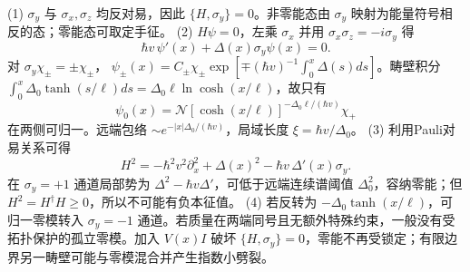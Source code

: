 (1) \(\sigma_y\) 与 \(\sigma_x,\sigma_z\) 均反对易，因此 \(\{H,\sigma_y\}=0\)。非零能态由 \(\sigma_y\) 映射为能量符号相反的态；零能态可取定手征。
(2) \(H\psi=0\)，左乘 \(\sigma_x\) 并用 \(\sigma_x\sigma_z=-i\sigma_y\) 得
\[
\hbar v\,\psi'(x)+\Delta(x)\sigma_y\psi(x)=0.
\]
对 \(\sigma_y\chi_\pm=\pm\chi_\pm\)，
\(\psi_\pm(x)=C_\pm\chi_\pm\exp[\mp(\hbar v)^{-1}\int_0^x\Delta(s)ds]\)。畴壁积分
\(\int_0^x\Delta_0\tanh(s/\ell)ds=\Delta_0\ell\ln\cosh(x/\ell)\)，故只有
\[
\psi_0(x)=\mathcal N[\cosh(x/\ell)]^{-\Delta_0\ell/(\hbar v)}\chi_+
\]
在两侧可归一。远端包络 \(\sim e^{-|x|\Delta_0/(\hbar v)}\)，局域长度 \(\xi=\hbar v/\Delta_0\)。
(3) 利用Pauli对易关系可得
\[
H^2=-\hbar^2v^2\partial_x^2+\Delta(x)^2-\hbar v\,\Delta'(x)\sigma_y.
\]
在 \(\sigma_y=+1\) 通道局部势为 \(\Delta^2-\hbar v\Delta'\)，可低于远端连续谱阈值 \(\Delta_0^2\)，容纳零能；但 \(H^2=H^\dagger H\ge0\)，所以不可能有负本征值。
(4) 若反转为 \(-\Delta_0\tanh(x/\ell)\)，可归一零模转入 \(\sigma_y=-1\) 通道。若质量在两端同号且无额外特殊约束，一般没有受拓扑保护的孤立零模。加入 \(V(x)I\) 破坏 \(\{H,\sigma_y\}=0\)，零能不再受锁定；有限边界另一畴壁可能与零模混合并产生指数小劈裂。
